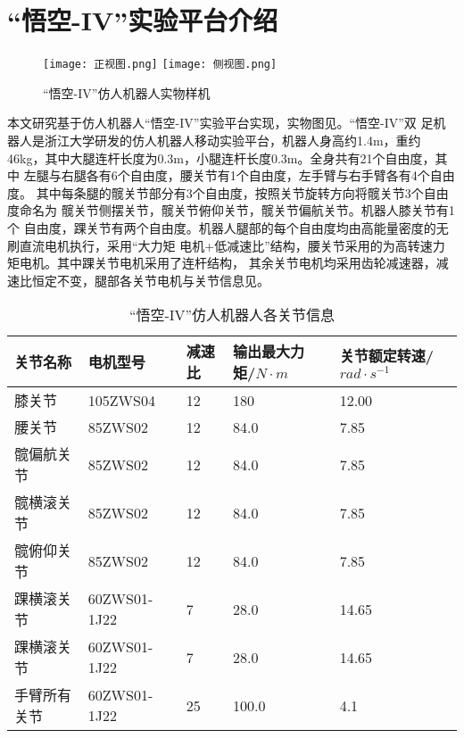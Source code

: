 \section{“悟空-IV”实验平台介绍}
\label{sec:exp_platform}
\begin{figure}[htbp]
    \centering
        {%
            \texttt{[image: 正视图.png]}}
        {%
            \texttt{[image: 侧视图.png]}}
    \caption{“悟空-IV”仿人机器人实物样机\label{fig:wukong_pic}}
\end{figure}
本文研究基于仿人机器人“悟空-IV”实验平台实现，实物图见。“悟空-IV”双
足机器人是浙江大学研发的仿人机器人移动实验平台，机器人身高约1.4m，重约
46kg，其中大腿连杆长度为0.3m，小腿连杆长度0.3m。全身共有21个自由度，其中
左腿与右腿各有6个自由度，腰关节有1个自由度，左手臂与右手臂各有4个自由度。
其中每条腿的髋关节部分有3个自由度，按照关节旋转方向将髋关节3个自由度命名为
髋关节侧摆关节，髋关节俯仰关节，髋关节偏航关节。机器人膝关节有1个
自由度，踝关节有两个自由度。机器人腿部的每个自由度均由高能量密度的无刷直流电机执行，采用“大力矩
电机+低减速比”结构，腰关节采用的为高转速力矩电机。其中踝关节电机采用了连杆结构，
其余关节电机均采用齿轮减速器，减速比恒定不变，腿部各关节电机与关节信息见。
\begin{table}[htbp]
	\centering
	\caption{“悟空-IV”仿人机器人各关节信息}
	\label{joint_motor}
	\begin{tabular}{m{3cm}<{\centering}m{3cm}<{\centering}m{1.5cm}<{\centering}m{2cm}<{\centering}m{2.5cm}<{\centering}}
		\toprule  %
		关节名称   &电机型号  &减速比  &输出最大力矩/$N \cdot m$ &关节额定转速/$rad\cdot s^{-1}$ \\
		\midrule  %
		膝关节 & 105ZWS04 & 12 & 180 & 12.00\\
		腰关节 & 85ZWS02 & 12 & 84.0 & 7.85\\        
		髋偏航关节 & 85ZWS02 & 12 & 84.0 & 7.85\\
		髋横滚关节 & 85ZWS02 & 12 & 84.0 & 7.85\\
		髋俯仰关节 & 85ZWS02 & 12 & 84.0 & 7.85\\
        踝横滚关节 & 60ZWS01-1J22 & 7 & 28.0 & 14.65\\
        踝横滚关节 & 60ZWS01-1J22 & 7 & 28.0 & 14.65\\
        手臂所有关节 & 60ZWS01-1J22 & 25 & 100.0 & 4.1\\
		\bottomrule %
	\end{tabular}
\end{table}
